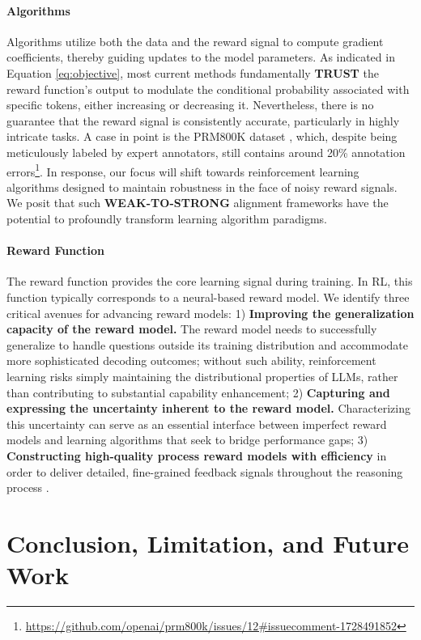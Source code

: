 \begin{itemize}[topsep=0pt]
\begin{itemize}[topsep=0pt]
\paragraph{Algorithms} Algorithms utilize both the data and the reward signal to compute gradient coefficients, thereby guiding updates to the model parameters. As indicated in Equation \ref{eq:objective}, most current methods fundamentally \textbf{TRUST} the reward function's output to modulate the conditional probability associated with specific tokens, either increasing or decreasing it. Nevertheless, there is no guarantee that the reward signal is consistently accurate, particularly in highly intricate tasks. A case in point is the PRM800K dataset \citep{lightman2023let}, which, despite being meticulously labeled by expert annotators, still contains around 20\% annotation errors\footnote{\url{https://github.com/openai/prm800k/issues/12\#issuecomment-1728491852}}. In response, our focus will shift towards reinforcement learning algorithms designed to maintain robustness in the face of noisy reward signals. We posit that such \textbf{WEAK-TO-STRONG} alignment frameworks \citep{burns2023weak} have the potential to profoundly transform learning algorithm paradigms.

\paragraph{Reward Function} The reward function provides the core learning signal during training. In RL, this function typically corresponds to a neural-based reward model. We identify three critical avenues for advancing reward models: 1) \textbf{Improving the generalization capacity of the reward model.} The reward model needs to successfully generalize to handle questions outside its training distribution and accommodate more sophisticated decoding outcomes; without such ability, reinforcement learning risks simply maintaining the distributional properties of LLMs, rather than contributing to substantial capability enhancement; 2) \textbf{Capturing and expressing the uncertainty inherent to the reward model.} Characterizing this uncertainty can serve as an essential interface between imperfect reward models and learning algorithms that seek to bridge performance gaps; 3) \textbf{Constructing high-quality process reward models with efficiency} in order to deliver detailed, fine-grained feedback signals throughout the reasoning process \citep{lightman2023let,wang2023math}.

\section{Conclusion, Limitation, and Future Work}


\end{itemize}
\end{itemize}
